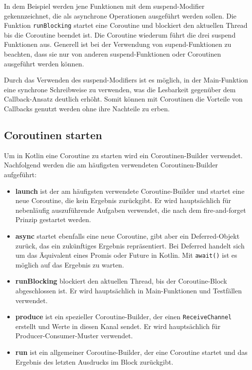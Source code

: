 \documentclass[fontsize=12pt,paper=a4,twoside=semi,parskip=half-,headsepline,headinclude]{scrreprt}
\begin{document}
In dem Beispiel werden jene Funktionen mit dem suspend-Modifier gekennzeichnet, die als asynchrone Operationen ausgeführt werden sollen. Die Funktion \texttt{runBlocking} startet eine Coroutine und blockiert den aktuellen Thread bis die Coroutine beendet ist. Die Coroutine wiederum führt die drei suspend Funktionen aus. Generell ist bei der Verwendung von supend-Funktionen zu beachten, dass sie nur von anderen suspend-Funktionen oder Coroutinen ausgeführt werden können.

Durch das Verwenden des suspend-Modifiers ist es möglich, in der Main-Funktion eine synchrone Schreibweise zu verwenden, was die Lesbarkeit gegenüber dem Callback-Ansatz deutlich erhöht. Somit können mit Coroutinen die Vorteile von Callbacks genutzt werden ohne ihre Nachteile zu erben.


\subsection{Coroutinen starten}

Um in Kotlin eine Coroutine zu starten wird ein Coroutinen-Builder verwendet. Nachfolgend werden  die am häufigsten verwendeten Coroutinen-Builder aufgeführt:

\begin{itemize}
	\item \textbf{launch} ist der am häufigsten verwendete Coroutine-Builder und startet eine neue Coroutine, die kein Ergebnis zurückgibt. Er wird hauptsächlich für nebenläufig auszuführende Aufgaben verwendet, die nach dem fire-and-forget Prinzip gestartet werden.
	\item \textbf{async} startet ebenfalls eine neue Coroutine, gibt aber ein Deferred-Objekt zurück, das ein zukünftiges Ergebnis repräsentiert. Bei Deferred handelt sich um das Äquivalent eines Promis oder Future in Kotlin. Mit \texttt{await()} ist es möglich auf das Ergebnis zu warten.
	\item \textbf{runBlocking} blockiert den aktuellen Thread, bis der Coroutine-Block abgeschlossen ist. Er wird hauptsächlich in Main-Funktionen und Testfällen verwendet.
	\item \textbf{produce} ist ein spezieller Coroutine-Builder, der einen \texttt{ReceiveChannel} erstellt und Werte in diesen Kanal sendet. Er wird hauptsächlich für Producer-Consumer-Muster verwendet.
	\item \textbf{run} ist ein allgemeiner Coroutine-Builder, der eine Coroutine startet und das Ergebnis des letzten Ausdrucks im Block zurückgibt.
\end{itemize}
\end{document}

